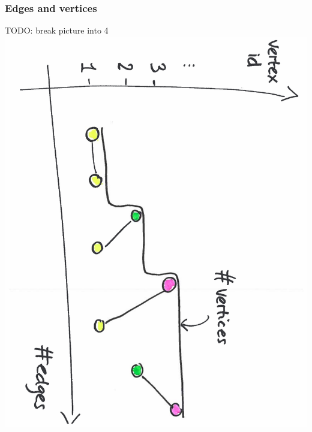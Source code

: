\documentclass[final,hyperref={pdfpagelabels=false},noamsthm]{beamer}
\begin{document}
\begin{frame}
	\frametitle{Edges and vertices}
	TODO: break picture into 4
	\includegraphics[angle=90,origin=c,scale=0.4]{fig/edgevertex}
\end{frame}
\end{document}
